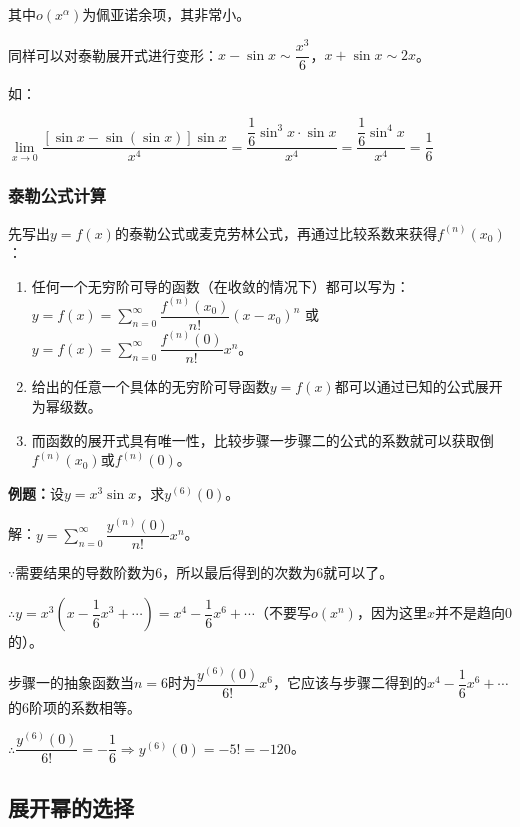 \documentclass[UTF8, 12pt]{ctexart}
\begin{document}
        其中$o(x^\alpha)$为佩亚诺余项，其非常小。

        同样可以对泰勒展开式进行变形：$x-\sin x\sim\dfrac{x^3}{6}$，$x+\sin x\sim 2x$。

        如：

        $\lim\limits_{x\to 0}\dfrac{[\sin x-\sin(\sin x)]\sin x}{x^4}=\dfrac{\dfrac{1}{6}\sin^3x\cdot\sin x}{x^4}=\dfrac{\dfrac{1}{6}\sin^4x}{x^4}=\dfrac{1}{6}$

        \subsubsection{泰勒公式计算}

        先写出$y=f(x)$的泰勒公式或麦克劳林公式，再通过比较系数来获得$f^{(n)}(x_0)$：

        \begin{enumerate}
            \item 任何一个无穷阶可导的函数（在收敛的情况下）都可以写为： \medskip \\
            $y=f(x)=\sum_{n=0}^\infty\dfrac{f^{(n)}(x_0)}{n!}(x-x_0)^n$ 或 $y=f(x)=\sum_{n=0}^\infty\dfrac{f^{(n)}(0)}{n!}x^n$。
            \item 给出的任意一个具体的无穷阶可导函数$y=f(x)$都可以通过已知的公式展开为幂级数。
            \item 而函数的展开式具有唯一性，比较步骤一步骤二的公式的系数就可以获取倒$f^{(n)}(x_0)$或$f^{(n)}(0)$。
        \end{enumerate}

        \textbf{例题：}设$y=x^3\sin x$，求$y^{(6)}(0)$。\medskip

        解：$y=\sum_{n=0}^\infty\dfrac{y^{(n)}(0)}{n!}x^n$。\medskip

        $\because$需要结果的导数阶数为6，所以最后得到的次数为6就可以了。\medskip

        $\therefore y=x^3\left(x-\dfrac{1}{6}x^3+\cdots\right)=x^4-\dfrac{1}{6}x^6+\cdots$（不要写$o(x^n)$，因为这里$x$并不是趋向0的）。

        步骤一的抽象函数当$n=6$时为$\dfrac{y^{(6)}(0)}{6!}x^6$，它应该与步骤二得到的$x^4-\dfrac{1}{6}x^6+\cdots$的6阶项的系数相等。

        $\therefore \dfrac{y^{(6)}(0)}{6!}=-\dfrac{1}{6}\Rightarrow y^{(6)}(0)=-5!=-120$。

        \subsection{展开幂的选择}
\end{document}
